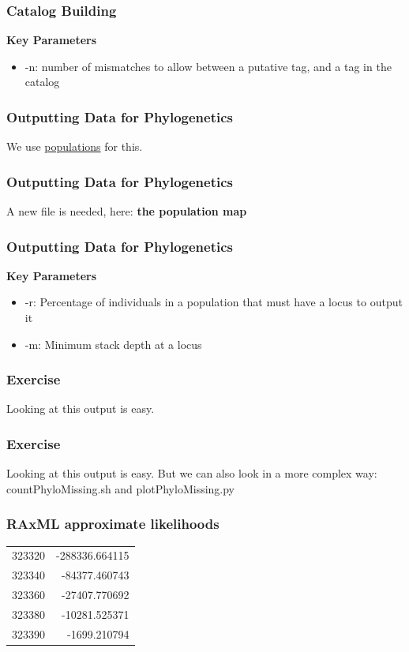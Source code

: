 \documentclass{beamer}
\begin{document}
\begin{frame}
\frametitle{Catalog Building}
\textbf{Key Parameters}
\begin{itemize}
\item -n: number of mismatches to allow between a putative tag, and a tag in the catalog
\end{itemize}
\end{frame}

\begin{frame}
\frametitle{Outputting Data for Phylogenetics}
We use \href{http://catchenlab.life.illinois.edu/stacks/comp/populations.php}{populations} for this. 
\end{frame}

\begin{frame}
\frametitle{Outputting Data for Phylogenetics}
A new file is needed, here: \textbf{the population map}
\end{frame}

\begin{frame}
\frametitle{Outputting Data for Phylogenetics}
\textbf{Key Parameters}
\begin{itemize}
\item -r: Percentage of individuals in a population that must have a locus to output it
\item -m: Minimum stack depth at a locus
\end{itemize}
\end{frame}

\begin{frame}
\frametitle{Exercise}
Looking at this output is easy.
\end{frame}

\begin{frame}
\frametitle{Exercise}
Looking at this output is easy.
But we can also look in a more complex way: countPhyloMissing.sh and plotPhyloMissing.py
\end{frame}

\begin{frame}
\frametitle{RAxML approximate likelihoods}

\begin{tabular}{ l  | r }
  323320 & -288336.664115  \\
  323340 & -84377.460743 \\
  323360 & -27407.770692\\
  323380 & -10281.525371\\
  323390 & -1699.210794 \\
\end{tabular}
\end{frame}
\end{document}
